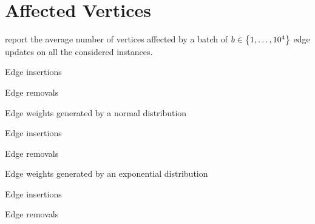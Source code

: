 
\section{Affected Vertices}

report the average number of vertices affected by a batch
of $b \in \set{1, \ldots, 10^4}$ edge updates on all the considered instances.


\begin{table}[h]
\centering\footnotesize
{}
\label{tab:dyn-mwm:affected-road}
\setlength{\tabcolsep}{2pt}

\begin{minipage}[t]{.5\textwidth}
\centering
Edge insertions


\end{minipage}\hfill
\begin{minipage}[t]{.5\textwidth}
\centering
Edge removals


\end{minipage}
\end{table}

\begin{table}[h]
\centering\footnotesize
{}

\begin{subtable}[t]{\textwidth}
\centering
\caption{Edge weights generated by a normal distribution}
\begin{minipage}[t]{.5\textwidth}
\centering
Edge insertions


\end{minipage}\hfill
\begin{minipage}[t]{.5\textwidth}
\centering
Edge removals


\end{minipage}
\end{subtable}\bigskip

\begin{subtable}[t]{\textwidth}
\centering
\caption{Edge weights generated by an exponential distribution}
\begin{minipage}[t]{.5\textwidth}
\centering
Edge insertions


\end{minipage}\hfill
\begin{minipage}[t]{.5\textwidth}
\centering
Edge removals


\end{minipage}
\end{subtable}
\end{table}

